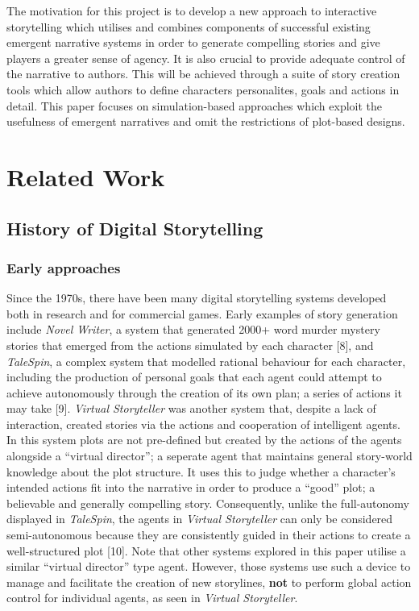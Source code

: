 \documentclass{sig-alternate-05-2015}
\begin{document}
\noindent The motivation for this project is to develop a new approach to interactive storytelling which utilises and combines components of successful existing emergent narrative systems in order to generate compelling stories and give players a greater sense of agency. It is also crucial to provide adequate control of the narrative to authors. This will be achieved through a suite of story creation tools which allow authors to define characters personalites, goals and actions in detail. This paper focuses on simulation-based approaches which exploit the usefulness of emergent narratives and omit the restrictions of plot-based designs.

\section{Related Work}
\subsection{History of Digital Storytelling}
\subsubsection{Early approaches}
Since the 1970s, there have been many digital storytelling systems developed both in research and for commercial games. Early examples of story generation include \textit{Novel Writer}, a system that generated 2000+ word murder mystery stories that emerged from the actions simulated by each character [8], and \textit{TaleSpin}, a complex system that modelled rational behaviour for each character, including the production of personal goals that each agent could attempt to achieve autonomously through the creation of its own plan; a series of actions it may take [9]. \textit{Virtual Storyteller} was another system that, despite a lack of interaction, created stories via the actions and cooperation of intelligent agents. In this system plots are not pre-defined but created by the actions of the agents alongside a ``virtual director''; a seperate agent that maintains general story-world knowledge about the plot structure. It uses this to judge whether a character's intended actions fit into the narrative in order to produce a ``good'' plot; a believable and generally compelling story. Consequently, unlike the full-autonomy displayed in \textit{TaleSpin}, the agents in \textit{Virtual Storyteller} can only be considered semi-autonomous because they are consistently guided in their actions to create a well-structured plot [10]. Note that other systems explored in this paper utilise a similar ``virtual director'' type agent. However, those systems use such a device to manage and facilitate the creation of new storylines, \textbf{not} to perform global action control for individual agents, as seen in \textit{Virtual Storyteller}.\\
\end{document}
